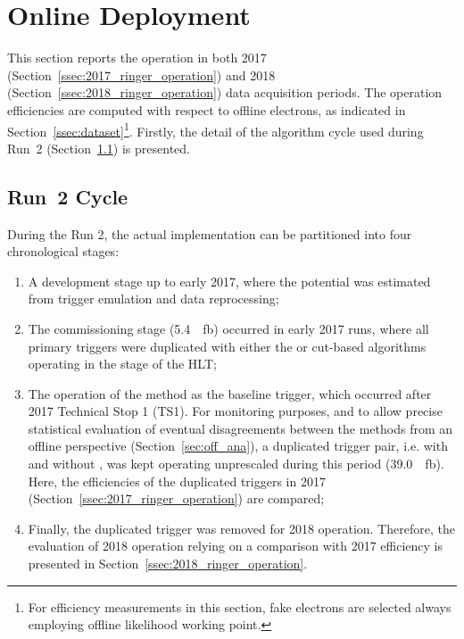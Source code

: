 \section{Online Deployment}%
\label{sec:operation}



This section reports the \rnn{} operation in both 2017
(Section~\ref{ssec:2017_ringer_operation}) and 2018
(Section~\ref{ssec:2018_ringer_operation}) data acquisition periods. The operation efficiencies
are computed with respect to offline electrons, as indicated in
Section~\ref{ssec:dataset}\footnote{For efficiency measurements in this section,
	fake electrons are selected always employing \veto\vloose{} offline likelihood
	working point.}. Firstly, the detail of the algorithm cycle used during Run~2
(Section~\ref{ssec:run2_rnn_cycle}) is presented.

\subsection{Run~2 \rnn{} Cycle}\label{ssec:run2_rnn_cycle}

During the Run 2, the actual \rnn{} implementation
can be partitioned into four chronological stages:

\begin{enumerate}[i]
  \item A development stage up to early 2017, where the \rnn{}
      potential was estimated from trigger emulation and data reprocessing;
  \item The commissioning stage (\SI{5.4}{\per\femto\barn}) occurred in
      early 2017 runs, where all primary
      triggers were duplicated with either the \rnn{} or cut-based algorithms
      operating in the \fastcalo{} stage of the HLT;
  \item The operation of the method as the baseline trigger, which occurred after 2017 Technical Stop 1 (TS1). For
    monitoring purposes, and to allow precise statistical evaluation of eventual
    disagreements between the \fastcalo{} methods from an offline
    perspective (Section~\ref{sec:off_ana}), a duplicated trigger pair, i.e.
    with and without \rnn{}, was kept operating unprescaled during this period
    (\SI{39.0}{\per\femto\barn}). Here, the efficiencies of the
    duplicated triggers in 2017 (Section~\ref{ssec:2017_ringer_operation}) are compared;
  \item Finally, the duplicated trigger was removed for 2018 operation.
    Therefore, the evaluation of 2018 \rnn{} operation relying on a comparison with
    2017 efficiency is presented in Section~\ref{ssec:2018_ringer_operation}.
\end{enumerate}

